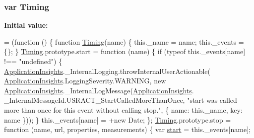 \subsubsection[{\texorpdfstring{Timing}{Timing}}]{\setlength{\rightskip}{0pt plus 5cm}var Timing}\hypertarget{obj_2_release_2_package_2_package_tmp_2_scripts_2ai_80_822_89-build00167_8js_afdd3ea2c773e0e94771da9013e155095}{}\label{obj_2_release_2_package_2_package_tmp_2_scripts_2ai_80_822_89-build00167_8js_afdd3ea2c773e0e94771da9013e155095}
{\bfseries Initial value\+:}
\begin{DoxyCode}
= (\textcolor{keyword}{function} () \{
            \textcolor{keyword}{function} \hyperlink{obj_2_release_2_package_2_package_tmp_2_scripts_2ai_80_822_89-build00167_8js_afdd3ea2c773e0e94771da9013e155095}{Timing}(name) \{
                this.\_name = name;
                this.\_events = \{\};
            \}
            \hyperlink{obj_2_release_2_package_2_package_tmp_2_scripts_2ai_80_822_89-build00167_8js_afdd3ea2c773e0e94771da9013e155095}{Timing}.prototype.start = \textcolor{keyword}{function} (name) \{
                \textcolor{keywordflow}{if} (typeof this.\_events[name] !== \textcolor{stringliteral}{"undefined"}) \{
                    \hyperlink{obj_2_release_2_package_2_package_tmp_2_scripts_2ai_80_822_89-build00167_8js_aa415ef4f8cdd699689ef4b61db7656d8}{ApplicationInsights}.\_InternalLogging.throwInternalUserActionable(
      \hyperlink{obj_2_release_2_package_2_package_tmp_2_scripts_2ai_80_822_89-build00167_8js_aa415ef4f8cdd699689ef4b61db7656d8}{ApplicationInsights}.LoggingSeverity.WARNING, \textcolor{keyword}{new} 
      \hyperlink{obj_2_release_2_package_2_package_tmp_2_scripts_2ai_80_822_89-build00167_8js_aa415ef4f8cdd699689ef4b61db7656d8}{ApplicationInsights}.\_InternalLogMessage(\hyperlink{obj_2_release_2_package_2_package_tmp_2_scripts_2ai_80_822_89-build00167_8js_aa415ef4f8cdd699689ef4b61db7656d8}{ApplicationInsights}.
      \_InternalMessageId.USRACT\_StartCalledMoreThanOnce, \textcolor{stringliteral}{"start was called more than once for this event without calling
       stop."}, \{ name: this.\_name, key: name \}));
                \}
                this.\_events[name] = +\textcolor{keyword}{new} Date;
            \};
            \hyperlink{obj_2_release_2_package_2_package_tmp_2_scripts_2ai_80_822_89-build00167_8js_afdd3ea2c773e0e94771da9013e155095}{Timing}.prototype.stop = \textcolor{keyword}{function} (name, url, properties, measurements) \{
                var \hyperlink{obj_2_release_2_package_2_package_tmp_2_scripts_2jquery-1_810_82_8js_aef10902ffededd983608fdb8dbfc441a}{start} = this.\_events[name];

\end{DoxyCode}
